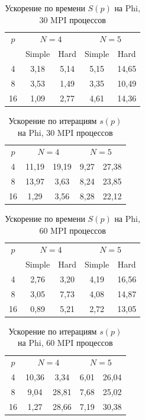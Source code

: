 \begin{table}
    \centering
    \begin{tabular}{|c|c|c|c|c|}
    \hline
    \(p\) & \multicolumn{2}{|c|}{\(N=4\)} & \multicolumn{2}{|c|}{\(N=5\)}\\ \cline{2-5}
    & Simple & Hard & Simple & Hard \\ \hline
	4 & 3,18 & 5,14 & 5,15 & 14,65 \\ \hline
	8 & 3,53 & 1,49 & 3,35 & 10,49 \\ \hline
	16 & 1,09 & 2,77 & 4,61 & 14,36 \\ \hline
    \end{tabular}
    \caption{Ускорение по времени \(S(p)\) на Phi, 30 MPI процессов}
    \label{table:time_speedUp_phi_30mpi}
\end{table}
\begin{table}
    \centering
    \begin{tabular}{|c|c|c|c|c|}
    \hline
    \(p\) & \multicolumn{2}{|c|}{\(N=4\)} & \multicolumn{2}{|c|}{\(N=5\)}\\ \cline{2-5}
	4 & 11,19 & 19,19 & 9,27 & 27,38 \\ \hline
	8 & 13,97 & 3,63 & 8,24 & 23,85 \\ \hline
	16 & 1,29 & 3,56 & 8,28 & 22,12 \\ \hline
	\end{tabular}
    \caption{Ускорение по итерациям \(s(p)\) на Phi, 30 MPI процессов}
    \label{table:iterations_speedUp_phi_30mpi}
\end{table}
\begin{table}
    \centering
    \begin{tabular}{|c|c|c|c|c|}
    \hline
    \(p\) & \multicolumn{2}{|c|}{\(N=4\)} & \multicolumn{2}{|c|}{\(N=5\)}\\ \cline{2-5}
    & Simple & Hard & Simple & Hard \\ \hline
	4 & 2,76 & 3,20 & 4,19 & 16,56 \\ \hline
	8 & 3,05 & 7,73 & 4,08 & 14,87 \\ \hline
	16 & 0,89 & 5,21 & 2,72 & 13,05 \\ \hline
    \end{tabular}
    \caption{Ускорение по времени \(S(p)\) на Phi, 60 MPI процессов}
    \label{table:time_speedUp_phi_60mpi}
\end{table}
\begin{table}
    \centering
    \begin{tabular}{|c|c|c|c|c|}
    \hline
    \(p\) & \multicolumn{2}{|c|}{\(N=4\)} & \multicolumn{2}{|c|}{\(N=5\)}\\ \cline{2-5}
	4 & 10,36 & 3,34 & 6,01 & 26,04 \\ \hline
	8 & 9,04 & 28,81 & 7,68 & 25,02 \\ \hline
	16 & 1,27 & 28,66 & 7,19 & 30,38 \\ \hline
	\end{tabular}
    \caption{Ускорение по итерациям \(s(p)\) на Phi, 60 MPI процессов}
    \label{table:iterations_speedUp_phi_60mpi}
\end{table}
